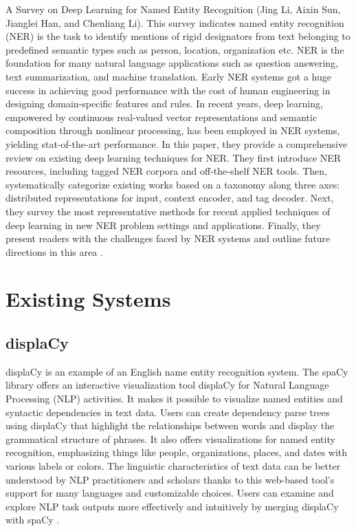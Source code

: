 A Survey on Deep Learning for Named Entity Recognition (Jing Li, Aixin Sun, Jianglei Han, and Chenliang Li). This survey indicates named entity recognition (NER) is the task to identify mentions of rigid designators from text belonging to predefined
semantic types such as person, location, organization etc. NER is the foundation for many natural language applications such as question answering, text summarization, and machine translation. Early NER systems got a huge success in achieving good performance with the cost of human engineering in designing domain-specific features and rules. In recent years, deep
learning, empowered by continuous real-valued vector representations and semantic composition through nonlinear processing, has
been employed in NER systems, yielding stat-of-the-art performance. In this paper, they provide a comprehensive review on existing
deep learning techniques for NER. They first introduce NER resources, including tagged NER corpora and off-the-shelf NER tools. Then, systematically categorize existing works based on a taxonomy along three axes: distributed representations for input, context
encoder, and tag decoder. Next, they survey the most representative methods for recent applied techniques of deep learning in new
NER problem settings and applications. Finally, they present readers with the challenges faced by NER systems and outline future
directions in this area \cite{li2020survey}.





\section{Existing Systems}
\vspace{10pt} %
\subsection{displaCy}
displaCy is an example of an English name entity recognition system. The spaCy library offers an interactive visualization tool displaCy for Natural Language Processing (NLP) activities. It makes it possible to visualize named entities and syntactic dependencies in text data. Users can create dependency parse trees using displaCy that highlight the relationships between words and display the grammatical structure of phrases. It also offers visualizations for named entity recognition, emphasizing things like people, organizations, places, and dates with various labels or colors. The linguistic characteristics of text data can be better understood by NLP practitioners and scholars thanks to this web-based tool’s support for many languages and customizable choices. Users can examine and explore NLP task outputs more effectively and intuitively by merging displaCy with spaCy \cite{displaCy}.
\\
\\

